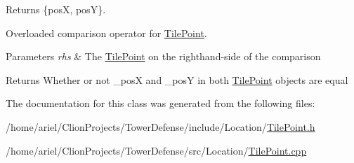 Returns \{posX, posY\}. 

Overloaded comparison operator for \hyperlink{classLocation_1_1TilePoint}{Tile\+Point}. 
\begin{DoxyParams}{Parameters}
{\em rhs} & The \hyperlink{classLocation_1_1TilePoint}{Tile\+Point} on the righthand-\/side of the comparison \\
\hline
\end{DoxyParams}
\begin{DoxyReturn}{Returns}
Whether or not \+\_\+posX and \+\_\+posY in both \hyperlink{classLocation_1_1TilePoint}{Tile\+Point} objects are equal 
\end{DoxyReturn}


The documentation for this class was generated from the following files\+:\begin{DoxyCompactItemize}
\item 
/home/ariel/\+Clion\+Projects/\+Tower\+Defense/include/\+Location/\hyperlink{TilePoint_8h}{Tile\+Point.\+h}\item 
/home/ariel/\+Clion\+Projects/\+Tower\+Defense/src/\+Location/\hyperlink{TilePoint_8cpp}{Tile\+Point.\+cpp}\end{DoxyCompactItemize}
